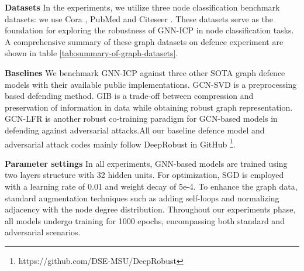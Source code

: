\documentclass[conference]{IEEEtran}
\begin{document}
\textbf{Datasets} 
In the experiments, we utilize three node classification benchmark datasets: we use Cora \cite{McCallum2000AutomatingTC}, PubMed \cite{Zhu2013ScalableTA} and Citeseer \cite{Sen2008CollectiveCI}. These datasets serve as the foundation for exploring the robustness of GNN-ICP in node classification tasks. A comprehensive summary of these graph datasets on defence experiment are shown in table \ref{tab:summary-of-graph-datasets}.

\textbf{Baselines} We benchmark GNN-ICP against three other SOTA graph defence models with their available public implementations. GCN-SVD \cite{xu2019topology} is a preprocessing based defending method. GIB \cite{wu2020graph} is a trade-off between compression and preservation of information in data while obtaining robust graph representation. GCN-LFR \cite{chang2021not} is another robust co-training paradigm for GCN-based models in defending against adversarial attacks.All our baseline defence model and adversarial attack codes mainly follow DeepRobust \cite{li2020deeprobust} in GitHub \footnote{https://github.com/DSE-MSU/DeepRobust}.


\textbf{Parameter settings} In all experiments, GNN-based models are trained using two layers structure with 32 hidden units. For optimization, SGD is employed with a learning rate of 0.01 and weight decay of 5e-4. To enhance the graph data, standard augmentation techniques such as adding self-loops and normalizing adjacency with the node degree distribution. Throughout our experiments phase, all models undergo training for 1000 epochs, encompassing both standard and adversarial scenarios.
\end{document}
